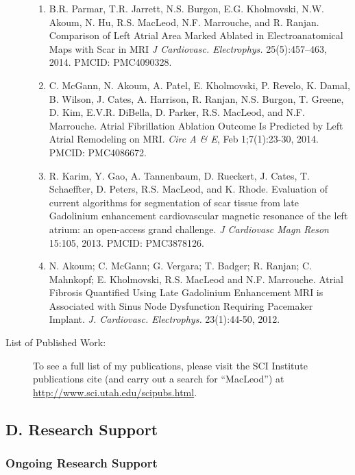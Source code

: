 \documentclass[10pt]{article}
\begin{document}
\begin{description}
    \begin{enumerate}
      \item B.R. Parmar, T.R. Jarrett, N.S. Burgon, E.G. Kholmovski,
        N.W. Akoum, N. Hu, R.S. MacLeod, N.F. Marrouche, and
        R. Ranjan. Comparison of Left Atrial Area Marked Ablated in
        Electroanatomical Maps with Scar in MRI \emph{J
          Cardiovasc. Electrophys.} 25(5):457--463, 2014. PMCID:
        PMC4090328.
      \item C. McGann, N. Akoum, A. Patel, E.  Kholmovski, P. Revelo,
        K. Damal, B. Wilson, J.  Cates, A. Harrison, R. Ranjan,
        N.S. Burgon, T. Greene, D. Kim, E.V.R. DiBella, D. Parker,
        R.S. MacLeod, and N.F. Marrouche.  Atrial Fibrillation Ablation
        Outcome Is Predicted by Left Atrial Remodeling on MRI. \emph{Circ A
          \& E}, Feb 1;7(1):23-30, 2014.  PMCID: PMC4086672. 
      \item R. Karim, Y. Gao, A. Tannenbaum, D.  Rueckert, J. Cates,
        T. Schaeffter, D. Peters, R.S. MacLeod, and K. Rhode.  Evaluation
        of current algorithms for segmentation of scar tissue from late
        Gadolinium enhancement cardiovascular magnetic resonance of the
        left atrium: an open-access grand challenge. \emph{J Cardiovasc
          Magn Reson} 15:105, 2013.  PMCID: PMC3878126.

      \item N. Akoum; C. McGann; G. Vergara; T. Badger; R. Ranjan;
        C. Mahnkopf; E. Kholmovski, R.S. MacLeod and N.F.
        Marrouche. Atrial Fibrosis Quantified Using Late Gadolinium
        Enhancement MRI is Associated with Sinus Node Dysfunction Requiring
        Pacemaker Implant. \emph{J. Cardiovasc. Electrophys.} 23(1):44-50,
        2012.

    \end{enumerate}

  \item[List of Published Work:] To see a full list of my publications,
    please visit the SCI Institute publications cite (and carry out a
    search for ``MacLeod'') at \url{http://www.sci.utah.edu/scipubs.html}.

\end{description}


\subsection*{D. Research Support}


\subsubsection*{Ongoing Research Support}
\end{document}
